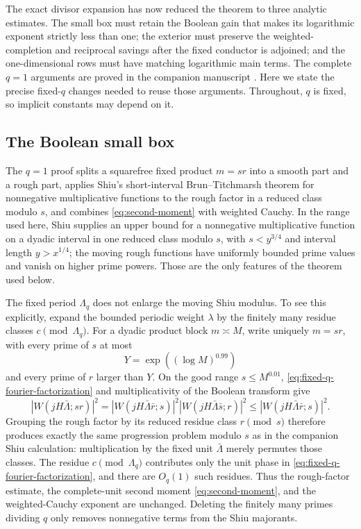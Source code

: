 \documentclass[11pt]{article}
\theoremstyle{definition}
\theoremstyle{remark}
\newcommand{\1}{\mathbf 1}
\begin{document}
The exact divisor expansion has now reduced the theorem to three analytic estimates.  The small box must retain the Boolean gain that makes its logarithmic exponent strictly less than one; the exterior must preserve the weighted-completion and reciprocal savings after the fixed conductor is adjoined; and the one-dimensional rows must have matching logarithmic main terms.  The complete $q=1$ arguments are proved in the companion manuscript \cite{DorseyPointwise2026}.  Here we state the precise fixed-$q$ changes needed to reuse those arguments.  Throughout, $q$ is fixed, so implicit constants may depend on it.

\subsection{The Boolean small box}

The $q=1$ proof splits a squarefree fixed product $m=sr$ into a smooth part and a rough part, applies Shiu's short-interval Brun--Titchmarsh theorem for nonnegative multiplicative functions \cite[Chapter~3, Theorem~1]{ShiuThesis1980} to the rough factor in a reduced class modulo $s$, and combines \eqref{eq:second-moment} with weighted Cauchy.  In the range used here, Shiu supplies an upper bound for a nonnegative multiplicative function on a dyadic interval in one reduced class modulo $s$, with $s<y^{3/4}$ and interval length $y>x^{1/4}$; the moving rough functions have uniformly bounded prime values and vanish on higher prime powers.  Those are the only features of the theorem used below.

The fixed period $\Lambda_q$ does not enlarge the moving Shiu modulus.  To see this explicitly, expand the bounded periodic weight $\lambda$ by the finitely many residue classes $c\pmod{\Lambda_q}$.  For a dyadic product block $m\asymp M$, write uniquely $m=sr$, with every prime of $s$ at most
\[
Y=\exp((\log M)^{0.99})
\]
and every prime of $r$ larger than $Y$.  On the good range $s\le M^{0.01}$, \eqref{eq:fixed-q-fourier-factorization} and multiplicativity of the Boolean transform give
\begin{equation}\label{eq:fixed-q-shiu-factor}
|W(jH\bar\Lambda;sr)|^2
=|W(jH\bar\Lambda\bar r;s)|^2
 |W(jH\bar\Lambda\bar s;r)|^2
\le |W(jH\bar\Lambda\bar r;s)|^2.
\end{equation}
Grouping the rough factor by its reduced residue class $r\pmod s$ therefore produces exactly the same progression problem modulo $s$ as in the companion Shiu calculation: multiplication by the fixed unit $\bar\Lambda$ merely permutes those classes.  The residue $c\pmod{\Lambda_q}$ contributes only the unit phase in \eqref{eq:fixed-q-fourier-factorization}, and there are $O_q(1)$ such residues.  Thus the rough-factor estimate, the complete-unit second moment \eqref{eq:second-moment}, and the weighted-Cauchy exponent are unchanged.  Deleting the finitely many primes dividing $q$ only removes nonnegative terms from the Shiu majorants.
\end{document}
